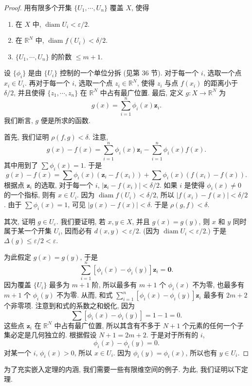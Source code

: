 \begin{proof}
用有限多个开集 $\{U_1,\cdots,U_n\}$ 覆盖 $X$, 使得
\begin{enumerate}
\item 在 $X$ 中, $\operatorname{diam}U_i<\varepsilon/2$.
\item 在 $\mathbb{R}^{N}$ 中, $\operatorname{diam}f(U_i)<\delta/2$.
\item $\{U_1,\cdots,U_n\}$ 的阶数 $\leqslant m+1$.
\end{enumerate}
设 $\{\phi_i\}$ 是由 $\{U_i\}$ 控制的一个单位分拆 (见第 36 节). 对于每一个 $i$, 选取一个点 $x_i\in U_i$. 再对于每一个 $i$, 选取一个点 $z_i\in\mathbb{R}^{N}$, 使得 $z_i$ 与点 $f(x_i)$ 的距离小于 $\delta/2$, 并且使得 $\{z_1,\cdots,z_n\}$ 在 $\mathbb{R}^{N}$ 中占有最广位置. 最后, 定义 $g\colon X\to\mathbb{R}^{N}$ 为
\[
g(x)=\sum_{i=1}^{n}\phi_{i}(x)\boldsymbol{z}_{i}.
\]
我们断言, $g$ 便是所求的函数.

首先, 我们证明 $\rho(f,g)<\delta$. 注意,
\[
g(x)-f(x)=\sum_{i=1}^{n}\phi_{i}(x)\boldsymbol{z}_{i}-\sum_{i=1}^{n}\phi_{i}(x)f(x).
\]
其中用到了 $\sum\phi_i(x)=1$. 于是
\[
g(x)-f(x)=\sum\phi_{i}(x)(\boldsymbol{z}_{i}-f(x_{i}))+\sum\phi_{i}(x)(f(x_{i})-f(x)).
\]
根据点 $\boldsymbol{z}_i$ 的选取, 对于每一个 $i$, $|\boldsymbol{z}_i-f(x_i)|<\delta/2$. 如果 $i$ 是使得 $\phi_i(x)\neq 0$ 的一个指标, 则有 $x\in U_i$. 因为 $\operatorname{diam}f(U_i)<\delta/2$, 所以 $|f(x_i)-f(x)|<\delta/2$. 由于 $\sum\phi_i(x)=1$, 可见 $|g(x)-f(x)|<\delta$. 于是 $\rho(g,f)<\delta$.

其次, 证明 $g\in U_\varepsilon$. 我们要证明, 若 $x,y\in X$, 并且 $g(x)=g(y)$, 则 $x$ 和 $y$ 同时属于某一个开集 $U_i$, 因而必有 $d(x,y)<\varepsilon/2$. (因为 $\operatorname{diam}U_i<\varepsilon/2$.) 于是 $\Delta(g)\leqslant\varepsilon/2<\varepsilon$.

为此假定 $g(x)=g(y)$, 于是
\[
\sum_{i=1}^{n}[\phi_{i}(x)-\phi_{i}(y)]\boldsymbol{z}_{i}=\boldsymbol{0}.
\]
因为覆盖 $\{U_i\}$ 最多为 $m+1$ 阶, 所以最多有 $m+1$ 个 $\phi_i(x)$ 不为零, 也最多有 $m+1$ 个 $\phi_i(y)$ 不为零. 从而, 和式 $\sum_{i=1}^{n}[\phi_i(x)-\phi_i(y)]\boldsymbol{z}_i$ 最多有 $2m+2$ 个非零项. 注意到和式的系数之和蜕化, 因为
\[
\sum[\phi_{i}(x)-\phi_{i}(y)]=1-1=0.
\]
这些点 $\boldsymbol{z}_i$ 在 $\mathbb{R}^{N}$ 中占有最广位置, 所以其含有不多于 $N+1$ 个元素的任何一个子集必定是几何独立的. 根据假设 $N+1=2m+2$. 于是对于所有的 $i$,
\[
\phi_{i}(x)-\phi_{i}(y)=0.
\]
对某一个 $i$, $\phi_i(x)>0$, 所以 $x\in U_i$. 因为 $\phi_i(y)=\phi_i(x)$, 所以也有 $y\in U_i$.
\end{proof}

为了充实嵌入定理的内涵, 我们需要一些有限维空间的例子. 为此, 我们证明以下定理.

